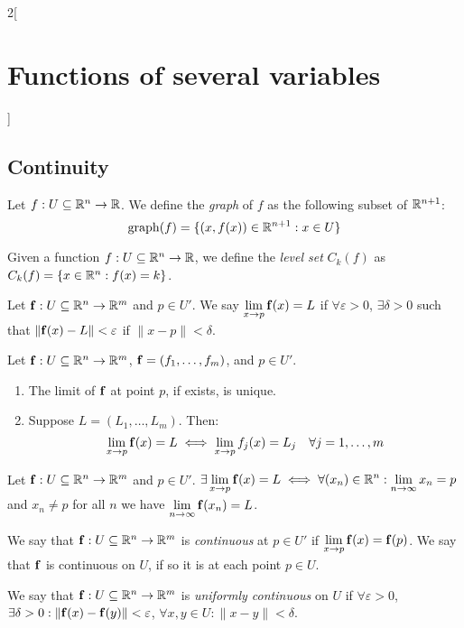 \documentclass[../../../main_math.tex]{subfiles}
\begin{document}
\begin{multicols}{2}[\section{Functions of several variables}]
  \subsection{Continuity}
  \begin{definition}
    Let $f:U\subseteq\mathbb{R}^n\rightarrow\mathbb{R} $. We define the \emph{graph} of $f$ as the following subset of $\mathbb{R}^{n+1}$: $$\operatorname{graph}(f)=\{(x,f(x))\in\mathbb{R}^{n+1}:x\in U\}$$
  \end{definition}
  \begin{definition}
    Given a function $f:U\subseteq\mathbb{R}^n\rightarrow\mathbb{R} $, we define the \emph{level set} $C_k(f)$ as $C_k(f)=\{x\in\mathbb{R}^n:f(x)=k\}$.
  \end{definition}
  \begin{definition}
    Let $\boldsymbol{\mathrm{f}}:U\subseteq\mathbb{R}^n\rightarrow\mathbb{R}^m$ and $p\in U'$. We say $\displaystyle\lim_{x\to p}\boldsymbol{\mathrm{f}}(x)=L$ if $\forall\varepsilon>0$, $\exists\delta>0$ such that $\|\boldsymbol{\mathrm{f}}(x)-L\|<\varepsilon$ if $\|x-p\|<\delta$.
  \end{definition}
  \begin{proposition}
    Let $\boldsymbol{\mathrm{f}}:U\subseteq\mathbb{R}^n\rightarrow\mathbb{R}^m$, $\boldsymbol{\mathrm{f}}=(f_1,\ldots,f_m)$, and $p\in U'$.
    \begin{enumerate}
      \item The limit of $\boldsymbol{\mathrm{f}}$ at point $p$, if exists, is unique.
      \item Suppose $L=(L_1,\ldots,L_m)$. Then: $$\lim_{x\to p}\boldsymbol{\mathrm{f}}(x)=L\iff\lim_{x\to p}f_j(x)=L_j\quad\forall j=1,\ldots,m$$
    \end{enumerate}
  \end{proposition}
  \begin{lemma}
    Let $\boldsymbol{\mathrm{f}}:U\subseteq\mathbb{R}^n\rightarrow\mathbb{R}^m$ and $p\in U'$. $\displaystyle\exists\lim_{x\to p}\boldsymbol{\mathrm{f}}(x)=L\iff\forall(x_n)\in\mathbb{R}^n:\lim_{n\to\infty}x_n=p$ and $x_n\ne p$ for all $n$ we have $\displaystyle\lim_{n\to \infty}\boldsymbol{\mathrm{f}}(x_n)=L$.
  \end{lemma}
  \begin{definition}
    We say that $\boldsymbol{\mathrm{f}}:U\subseteq\mathbb{R}^n\rightarrow\mathbb{R}^m$ is \emph{continuous} at $p\in U'$ if $\displaystyle\lim_{x\to p}\boldsymbol{\mathrm{f}}(x)=\boldsymbol{\mathrm{f}}(p)$. We say that $\boldsymbol{\mathrm{f}}$ is continuous on $U$, if so it is at each point $p\in U$.
  \end{definition}
  \begin{definition}
    We say that $\boldsymbol{\mathrm{f}}:U\subseteq\mathbb{R}^n\rightarrow\mathbb{R}^m$ is \emph{uniformly continuous} on $U$ if $\forall\varepsilon>0$, $\exists\delta>0:\|\boldsymbol{\mathrm{f}}(x)-\boldsymbol{\mathrm{f}}(y)\|<\varepsilon$, $\forall x,y\in U:\|x-y\|<\delta$.

\end{definition}
\end{multicols}
\end{document}
